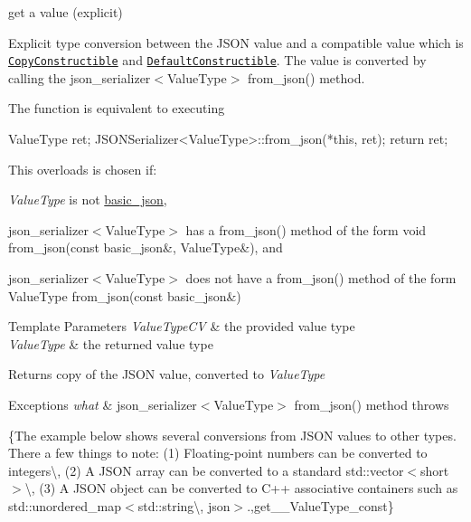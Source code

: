 get a value (explicit) 

Explicit type conversion between the J\+S\+ON value and a compatible value which is \href{http://en.cppreference.com/w/cpp/concept/CopyConstructible}{\tt Copy\+Constructible} and \href{http://en.cppreference.com/w/cpp/concept/DefaultConstructible}{\tt Default\+Constructible}. The value is converted by calling the json\+\_\+serializer$<$\+Value\+Type$>$ {\ttfamily from\+\_\+json()} method.

The function is equivalent to executing 
\begin{DoxyCode}
ValueType ret;
JSONSerializer<ValueType>::from\_json(*\textcolor{keyword}{this}, ret);
\textcolor{keywordflow}{return} ret;
\end{DoxyCode}


This overloads is chosen if\+:
\begin{DoxyItemize}
\item {\itshape Value\+Type} is not \mbox{\hyperlink{classnlohmann_1_1basic__json}{basic\+\_\+json}},
\item json\+\_\+serializer$<$\+Value\+Type$>$ has a {\ttfamily from\+\_\+json()} method of the form {\ttfamily void from\+\_\+json(const basic\+\_\+json\&, Value\+Type\&)}, and
\item json\+\_\+serializer$<$\+Value\+Type$>$ does not have a {\ttfamily from\+\_\+json()} method of the form {\ttfamily Value\+Type from\+\_\+json(const basic\+\_\+json\&)}
\end{DoxyItemize}


\begin{DoxyTemplParams}{Template Parameters}
{\em Value\+Type\+CV} & the provided value type \\
\hline
{\em Value\+Type} & the returned value type\\
\hline
\end{DoxyTemplParams}
\begin{DoxyReturn}{Returns}
copy of the J\+S\+ON value, converted to {\itshape Value\+Type} 
\end{DoxyReturn}

\begin{DoxyExceptions}{Exceptions}
{\em what} & json\+\_\+serializer$<$\+Value\+Type$>$ {\ttfamily from\+\_\+json()} method throws\\
\hline
\end{DoxyExceptions}
\{The example below shows several conversions from J\+S\+ON values to other types. There a few things to note\+: (1) Floating-\/point numbers can be converted to integers\textbackslash{}, (2) A J\+S\+ON array can be converted to a standard {\ttfamily std\+::vector$<$short$>$}\textbackslash{}, (3) A J\+S\+ON object can be converted to C++ associative containers such as {\ttfamily std\+::unordered\+\_\+map$<$std\+::string\textbackslash{}, json$>$}.,get\+\_\+\+\_\+\+Value\+Type\+\_\+const\}

